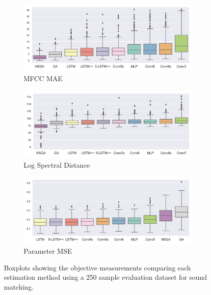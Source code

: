 \begin{figure}[p]
    \centering
    \begin{subfigure}[b]{0.99\textwidth}
        \centering
        \includegraphics[width=\textwidth]{figures/inverse-synth/mfcc_mae_boxplot.png}
        \caption{MFCC MAE}
        \label{fig:mfcc-mae}
    \end{subfigure}
    \begin{subfigure}[b]{0.99\textwidth}
        \centering
        \includegraphics[width=\textwidth]{figures/inverse-synth/lsd_boxplot.png}
        \caption{Log Spectral Distance}
        \label{fig:lsd}
    \end{subfigure}
    \begin{subfigure}[b]{0.99\textwidth}
        \centering
        \includegraphics[width=\textwidth]{figures/inverse-synth/parameter_boxplot.png}
        \caption{Parameter MSE}
        \label{fig:param-mse}
    \end{subfigure}
    \caption{Boxplots showing the objective measurements comparing each estimation method using a 250 sample evaluation dataset for sound matching.}
    \label{fig:eval-bocplot}
\end{figure}


